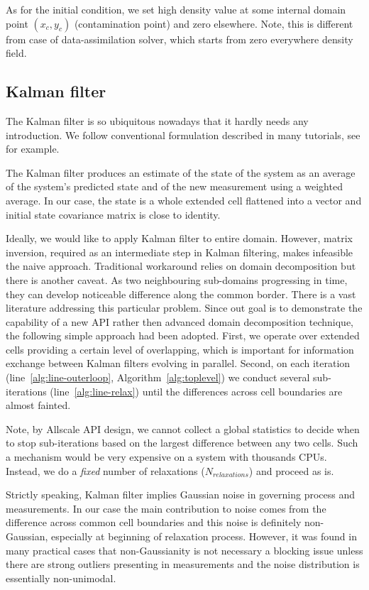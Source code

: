 \documentclass[acmsmall,review,anonymous]{acmart}\settopmatter{printfolios=true,printccs=false,printacmref=false}
\begin{document}
As for the initial condition, we set high density value at some internal domain point $(x_c,y_c)$ (contamination point) and zero elsewhere. Note, this is different from case of data-assimilation solver, which starts from zero everywhere density field.

\subsection{Kalman filter\label{sec:kalman}}

The Kalman filter is so ubiquitous nowadays that it hardly needs any introduction. We follow conventional formulation described in many tutorials, see \cite{Welch06} for example.

The Kalman filter produces an estimate of the state of the system as an average of the system's predicted state and of the new measurement using a weighted average. In our case, the state is a whole extended cell flattened into a vector and initial state covariance matrix is close to identity. 

Ideally, we would like to apply Kalman filter to entire domain. However, matrix inversion, required as an intermediate step in Kalman filtering, makes infeasible the naive approach. Traditional workaround relies on domain decomposition but there is another caveat. As two neighbouring sub-domains progressing in time, they can develop noticeable difference along the common border. There is a vast literature addressing this particular problem. Since out goal is to demonstrate the capability of a new API rather then advanced domain decomposition technique, the following simple approach had been adopted. First, we operate over extended cells providing a certain level of overlapping, which is important for information exchange between Kalman filters evolving in parallel. Second, on each iteration (line~\ref{alg:line-outerloop}, Algorithm~\ref{alg:toplevel}) we conduct several sub-iterations (line~\ref{alg:line-relax}) until the differences across cell boundaries are almost fainted.

Note, by Allscale API design, we cannot collect a global statistics to decide when to stop sub-iterations based on the largest difference between any two cells. Such a mechanism would be very expensive on a system with thousands CPUs. Instead, we do a \textit{fixed} number of relaxations ($N_{relaxations}$) and proceed as is.

Strictly speaking, Kalman filter implies Gaussian noise in governing process and measurements. In our case the main contribution to noise comes from the difference across common cell boundaries and this noise is definitely non-Gaussian, especially at beginning of relaxation process. However, it was found in many practical cases that non-Gaussianity is not necessary a blocking issue unless there are strong outliers presenting in measurements and the noise distribution is essentially non-unimodal. 
\end{document}
